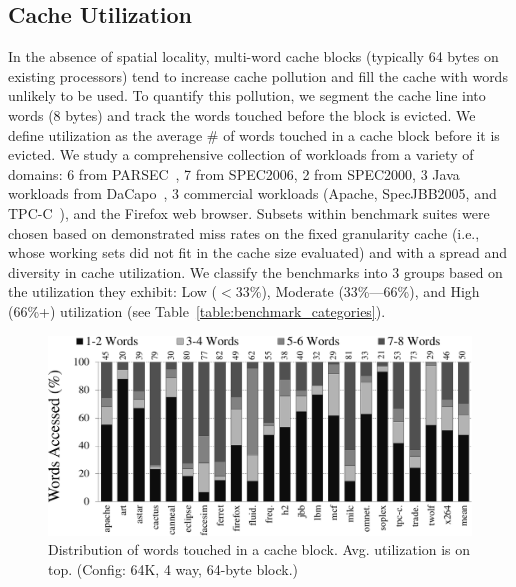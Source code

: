 \subsection{Cache Utilization}

In the absence of spatial locality, multi-word cache blocks (typically 64
bytes on existing processors) tend to increase cache pollution and fill the
cache with words unlikely to be used.  To quantify this pollution, we segment
the cache line into words (8 bytes) and track the words touched before the
block is evicted.  We define utilization as the average \# of words touched in
a cache block before it is evicted. We study a comprehensive collection of
workloads from a variety of domains: 6 from PARSEC~\cite{Bienia:2008:PBS:1454115.1454128}, 7 from
SPEC2006, 2 from SPEC2000, 3 Java workloads from DaCapo~\cite{Blackburn:2006:DBJ:1167473.1167488}, 3
commercial workloads (Apache, SpecJBB2005, and TPC-C~\cite{Llanos:2006:TOT:1228268.1228270}), and the
Firefox web browser.  Subsets within benchmark suites were chosen based on
demonstrated miss rates on the fixed granularity cache (i.e., whose working
sets did not fit in the cache size evaluated) and with a spread and diversity
in cache utilization.  We classify the benchmarks into 3 groups
based on the utilization they exhibit: Low ($<$33\%), Moderate (33\%---66\%),
and High (66\%+) utilization (see Table~\ref{table:benchmark_categories}).


\begin{figure}[!h]

 \centering
  \includegraphics[width=\textwidth]{files/Plots/05-StackBar_Word_Access_64K.pdf}
  \caption[Distribution of words touched]{Distribution of words touched in a cache
    block. Avg. utilization is on top. (Config:
    64K, 4 way, 64-byte block.)}
  \label{fig:stackbar_words_64k}
\end{figure}

